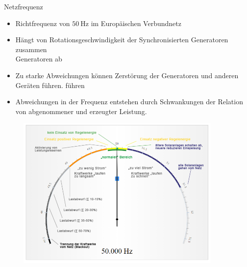 \documentclass[aspectratio=1610, professionalfonts, 9pt]{beamer}
\begin{document}
\begin{frame}{Netzfrequenz}
\begin{itemize}[<+->]
\item Richtfrequenz von $\SI{50}{\hertz}$ im Europäischen Verbundnetz
\item Hängt von Rotationsgeschwindigkeit der Synchronisierten Generatoren zusammen\\
Generatoren ab
\item Zu starke Abweichungen können Zerstörung der Generatoren und anderen Geräten führen.
führen
\item Abweichungen in der Frequenz entstehen durch Schwankungen
der Relation von abgenommener und erzeugter Leistung.
\end{itemize}
\end{frame}

{
\begin{frame}
  \begin{figure}
  \includegraphics[width=0.9\textwidth]{images/Frequenz.png}
  \end{figure}
\end{frame}
}
\end{document}
